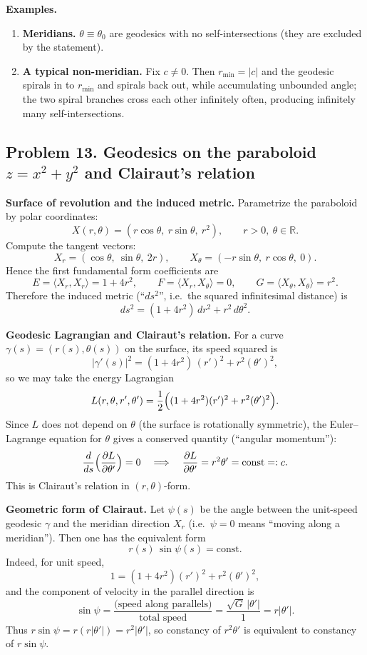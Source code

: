 \documentclass[12pt,a4paper]{article}
\theoremstyle{plain}
\theoremstyle{definition}      %
\begin{document}
	\medskip
	\textbf{Examples.}
	\begin{enumerate}
		\item \textbf{Meridians.} $\theta\equiv\theta_0$ are geodesics with no self-intersections (they are excluded by the statement).
		\item \textbf{A typical non-meridian.} Fix $c\neq 0$. Then $r_{\min}=|c|$ and the geodesic spirals in to $r_{\min}$ and spirals back out,
		while accumulating unbounded angle; the two spiral branches cross each other infinitely often, producing infinitely many self-intersections.
	\end{enumerate}
	
	\subsection*{Problem 13. Geodesics on the paraboloid $z=x^2+y^2$ and Clairaut's relation}
	
	\textbf{Surface of revolution and the induced metric.}
	Parametrize the paraboloid by polar coordinates:
	\[
	X(r,\theta)=(r\cos\theta,\ r\sin\theta,\ r^2),\qquad r>0,\ \theta\in\mathbb R.
	\]
	Compute the tangent vectors:
	\[
	X_r=(\cos\theta,\ \sin\theta,\ 2r),\qquad
	X_\theta=(-r\sin\theta,\ r\cos\theta,\ 0).
	\]
	Hence the first fundamental form coefficients are
	\[
	E=\langle X_r,X_r\rangle=1+4r^2,\qquad
	F=\langle X_r,X_\theta\rangle=0,\qquad
	G=\langle X_\theta,X_\theta\rangle=r^2.
	\]
	Therefore the induced metric (``$ds^2$'', i.e.\ the squared infinitesimal distance) is
	\[
	ds^2=(1+4r^2)\,dr^2+r^2\,d\theta^2.
	\]
	
	\medskip
	\textbf{Geodesic Lagrangian and Clairaut's relation.}
	For a curve $\gamma(s)=(r(s),\theta(s))$ on the surface, its speed squared is
	\[
	|\gamma'(s)|^2=(1+4r^2)\,(r')^2+r^2(\theta')^2,
	\]
	so we may take the energy Lagrangian
	\[
	L(r,\theta,r',\theta')=\frac12\Bigl((1+4r^2)(r')^2+r^2(\theta')^2\Bigr).
	\]
	Since $L$ does not depend on $\theta$ (the surface is rotationally symmetric), the Euler--Lagrange equation for $\theta$
	gives a conserved quantity (``angular momentum''):
	\[
	\frac{d}{ds}\Bigl(\frac{\partial L}{\partial \theta'}\Bigr)=0
	\quad\Longrightarrow\quad
	\frac{\partial L}{\partial \theta'}=r^2\theta'=\text{const}=:c.
	\]
	This is Clairaut's relation in $(r,\theta)$-form.
	
	\medskip
	\textbf{Geometric form of Clairaut.}
	Let $\psi(s)$ be the angle between the unit-speed geodesic $\gamma$ and the meridian direction $X_r$
	(i.e.\ $\psi=0$ means ``moving along a meridian''). Then one has the equivalent form
	\[
	r(s)\,\sin\psi(s)=\text{const}.
	\]
	Indeed, for unit speed,
	\[
	1=(1+4r^2)(r')^2+r^2(\theta')^2,
	\]
	and the component of velocity in the parallel direction is
	\[
	\sin\psi = \frac{\text{(speed along parallels)}}{\text{total speed}}
	= \frac{\sqrt{G}\,|\theta'|}{1} = r|\theta'|.
	\]
	Thus $r\sin\psi = r(r|\theta'|)=r^2|\theta'|$, so constancy of $r^2\theta'$ is equivalent to constancy of $r\sin\psi$.
	
\end{document}
